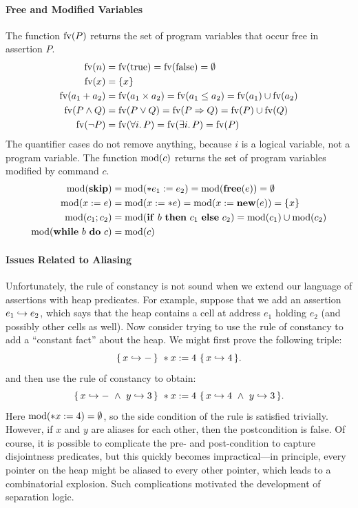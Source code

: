 \paragraph{Free and Modified Variables}
The function $\mathrm{fv}(P)$ returns the set of program variables that occur free in assertion $P$.
\begin{align*}
  \mathrm{fv}(n)&=\mathrm{fv}(\mathrm{true})=\mathrm{fv}(\mathrm{false})=\emptyset\\
  \mathrm{fv}(x)&=\{x\}\\
  \mathrm{fv}(a_1+a_2)&=\mathrm{fv}(a_1\times a_2)=\mathrm{fv}(a_1\le a_2)=\mathrm{fv}(a_1)\cup\mathrm{fv}(a_2)\\
  \mathrm{fv}(P\wedge Q)&=\mathrm{fv}(P\vee Q)=\mathrm{fv}(P\Rightarrow Q)=\mathrm{fv}(P)\cup\mathrm{fv}(Q)\\
  \mathrm{fv}(\neg P)&=\mathrm{fv}(\forall i.\,P)=\mathrm{fv}(\exists i.\,P)=\mathrm{fv}(P)
\end{align*}
The quantifier cases do not remove anything, because $i$ is a logical variable, not a program
variable.
%
The function $\mathrm{mod}(c)$ returns the set of program variables modified by command $c$.
\begin{align*}
  \modv(\kw{skip})&=\modv(\ast e_1:=e_2)=\modv(\kw{free}(e))=\emptyset\\
  \modv(x:=e)&=\modv(x:=\ast e)=\modv(x:=\kw{new}(e))=\{x\}\\
  \modv(c_1;c_2)&=\modv(\kw{if}\ b\ \kw{then}\ c_1\ \kw{else}\ c_2)=\modv(c_1)\cup\modv(c_2)\\
  \modv(\kw{while}\ b\ \kw{do}\ c)&=\modv(c)
\end{align*}
%
\paragraph{Issues Related to Aliasing} Unfortunately, the rule of constancy is not sound when we
extend our language of assertions with heap predicates. For example, suppose that we add an
assertion $e_1\hookrightarrow e_2$, which says that the heap contains a cell at address $e_1$ holding $e_2$
(and possibly other cells as well). Now consider trying to use the rule of constancy to add a
``constant fact'' about the heap. We might first prove the following triple:
\[
  \{\,x\pto-\,\}\ \ast x:=4\ \{\,x\pto 4\,\}.
\]
and then use the rule of constancy to obtain:
\[
  \{\,x\pto-\ \wedge\ y\pto 3\,\}\ \ast x:=4\ \{\,x\pto 4\ \wedge\ y\pto 3\,\}.
\]
Here $\mathrm{mod}(\ast x:=4)=\emptyset$, so the side condition of the rule is satisfied trivially.
However, if $x$ and $y$ are aliases for each other, then the postcondition is false. Of course, it
is possible to complicate the pre- and post-condition to capture disjointness predicates, but this
quickly becomes impractical---in principle, every pointer on the heap might be aliased to every
other pointer, which leads to a combinatorial explosion. Such complications motivated the
development of separation logic.
%
